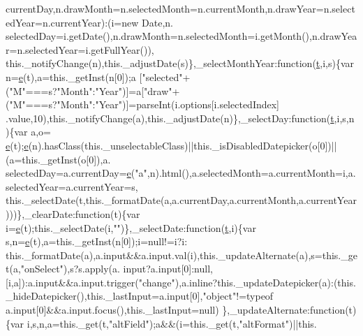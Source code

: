 \begin{DoxyCode}
      currentDay,n.drawMonth=n.selectedMonth=n.currentMonth,n.drawYear=n.selectedYear=n.currentYear):(i=\textcolor{keyword}{new} Date,n.
      selectedDay=i.getDate(),n.drawMonth=n.selectedMonth=i.getMonth(),n.drawYear=n.selectedYear=i.getFullYear()),
      this.\_notifyChange(n),this.\_adjustDate(s)\},\_selectMonthYear:\textcolor{keyword}{function}(\hyperlink{jquery-2_80_83_8min_8js_aaccc9105df5383111407fd5b41255e23}{t},i,s)\{var n=\hyperlink{jquery-ui_8min_8js_a2c038346d47955cbe2cb91e338edd7e1}{e}(t),a=this.\_getInst(n[0]);a
      [\textcolor{stringliteral}{"selected"}+(\textcolor{stringliteral}{"M"}===s?\textcolor{stringliteral}{"Month"}:\textcolor{stringliteral}{"Year"})]=a[\textcolor{stringliteral}{"draw"}+(\textcolor{stringliteral}{"M"}===s?\textcolor{stringliteral}{"Month"}:\textcolor{stringliteral}{"Year"})]=parseInt(i.options[i.selectedIndex]
      .value,10),this.\_notifyChange(a),this.\_adjustDate(n)\},\_selectDay:\textcolor{keyword}{function}(\hyperlink{jquery-2_80_83_8min_8js_aaccc9105df5383111407fd5b41255e23}{t},i,s,n)\{var a,o=
      \hyperlink{jquery-ui_8min_8js_a2c038346d47955cbe2cb91e338edd7e1}{e}(t);\hyperlink{jquery-ui_8min_8js_a2c038346d47955cbe2cb91e338edd7e1}{e}(n).hasClass(this.\_unselectableClass)||this.\_isDisabledDatepicker(o[0])||(a=this.\_getInst(o[0]),a.
      selectedDay=a.currentDay=\hyperlink{jquery-ui_8min_8js_a2c038346d47955cbe2cb91e338edd7e1}{e}(\textcolor{stringliteral}{"a"},n).html(),a.selectedMonth=a.currentMonth=i,a.selectedYear=a.currentYear=s,
      this.\_selectDate(t,this.\_formatDate(a,a.currentDay,a.currentMonth,a.currentYear)))\},\_clearDate:\textcolor{keyword}{function}(t)\{var 
      i=\hyperlink{jquery-ui_8min_8js_a2c038346d47955cbe2cb91e338edd7e1}{e}(t);this.\_selectDate(i,\textcolor{stringliteral}{""})\},\_selectDate:\textcolor{keyword}{function}(\hyperlink{jquery-2_80_83_8min_8js_aaccc9105df5383111407fd5b41255e23}{t},i)\{var s,n=\hyperlink{jquery-ui_8min_8js_a2c038346d47955cbe2cb91e338edd7e1}{e}(t),a=this.\_getInst(n[0]);i=null!=i?i:
      this.\_formatDate(a),a.input&&a.input.val(i),this.\_updateAlternate(a),s=this.\_get(a,\textcolor{stringliteral}{"onSelect"}),s?s.apply(a.
      input?a.input[0]:null,[i,a]):a.input&&a.input.trigger(\textcolor{stringliteral}{"change"}),a.inline?this.\_updateDatepicker(a):(this.
      \_hideDatepicker(),this.\_lastInput=a.input[0],\textcolor{stringliteral}{"object"}!=typeof a.input[0]&&a.input.focus(),this.\_lastInput=null)
\},\_updateAlternate:function(t)\{var i,s,n,a=this.\_get(t,\textcolor{stringliteral}{"altField"});a&&(i=this.\_get(t,\textcolor{stringliteral}{"altFormat"})||this.

\end{DoxyCode}
